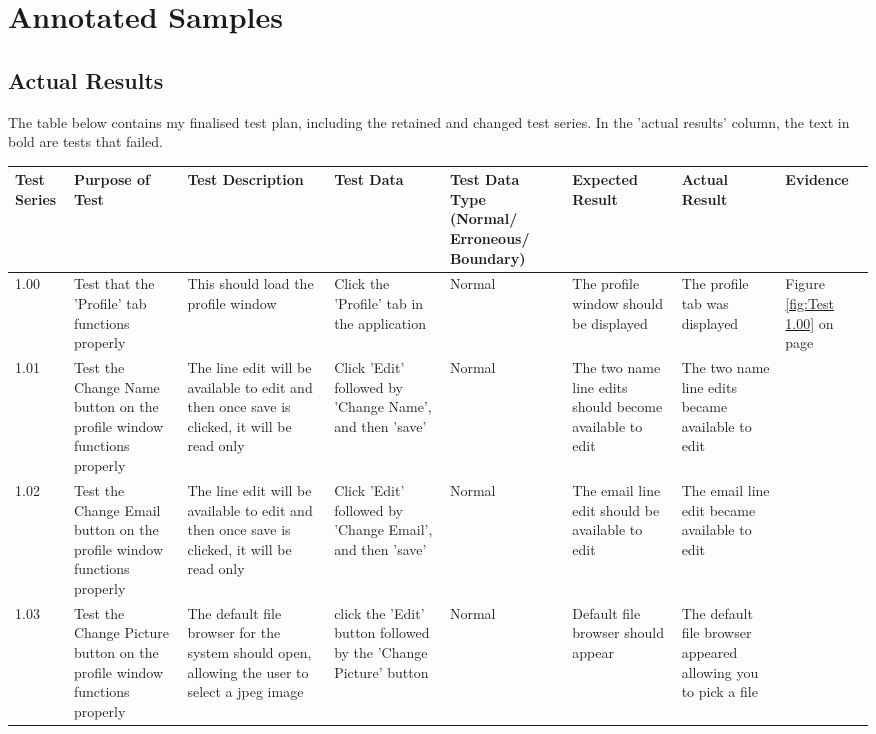 \section{Annotated Samples}

\subsection{Actual Results}

The table below contains my finalised test plan, including the retained and changed test series. In the 'actual results' column, the text in bold are tests that failed.

\begin{landscape}
\begin{center}
    \begin{longtable}{|p{1.5cm}|p{2.5cm}|p{2.5cm}|p{2cm}|p{2cm}|p{2cm}|p{2cm}|p{2cm}|}
        \hline
        \textbf{Test Series} & \textbf{Purpose of Test} & \textbf{Test Description} & \textbf{Test Data} & \textbf{Test Data Type (Normal/ Erroneous/ Boundary)} & \textbf{Expected Result} & \textbf{Actual Result} & \textbf{Evidence}\\ \hline
1.00 & Test that the 'Profile' tab functions properly & This should load the profile window & Click the 'Profile' tab in the application & Normal & The profile window should be displayed & The profile tab was displayed & Figure \ref{fig:Test 1.00} on page \pageref{fig:Test 1.00} \\ \hline

1.01 & Test the Change Name button on the profile window functions properly & The line edit will be available to edit and then once save is clicked, it will be read only  &  Click 'Edit' followed by 'Change Name', and then 'save' & Normal & The two name line edits should become available to edit & The two name line edits became available to edit & \\ \hline

1.02 & Test the Change Email button on the profile window functions properly & The line edit will be available to edit and then once save is clicked, it will be read only & Click 'Edit' followed by 'Change Email', and then 'save' & Normal &  The email line edit should be available to edit & The email line edit became available to edit &  \\ \hline

1.03 & Test the Change Picture button on the profile window functions properly &  The default file browser for the system should open, allowing the user to select a jpeg image & click the 'Edit' button followed by the 'Change Picture' button & Normal & Default file browser should appear & The default file browser appeared allowing you to pick a file &\\ \hline


\end{longtable}
\end{center}
\end{landscape}
